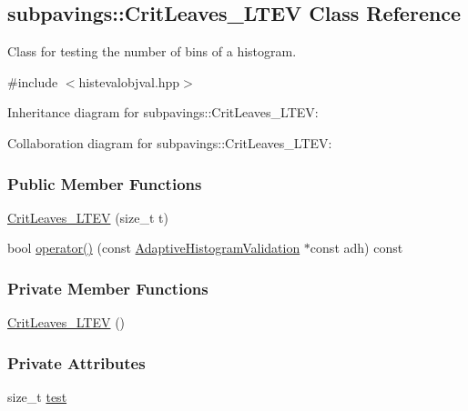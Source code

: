 \hypertarget{classsubpavings_1_1CritLeaves__LTEV}{\subsection{subpavings\-:\-:\-Crit\-Leaves\-\_\-\-L\-T\-E\-V \-Class \-Reference}
\label{classsubpavings_1_1CritLeaves__LTEV}
}


\-Class for testing the number of bins of a histogram.  




{\ttfamily \#include $<$histevalobjval.\-hpp$>$}



\-Inheritance diagram for subpavings\-:\-:\-Crit\-Leaves\-\_\-\-L\-T\-E\-V\-:


\-Collaboration diagram for subpavings\-:\-:\-Crit\-Leaves\-\_\-\-L\-T\-E\-V\-:
\subsubsection*{\-Public \-Member \-Functions}
\begin{DoxyCompactItemize}
\item 
\hyperlink{classsubpavings_1_1CritLeaves__LTEV_a9d5c9272d5b73caee48f245fcc6889e5}{\-Crit\-Leaves\-\_\-\-L\-T\-E\-V} (size\-\_\-t t)
\item 
bool \hyperlink{classsubpavings_1_1CritLeaves__LTEV_af02abe8af576a43ccd40e44cc55fcf1e}{operator()} (const \hyperlink{classsubpavings_1_1AdaptiveHistogramValidation}{\-Adaptive\-Histogram\-Validation} $\ast$const adh) const 
\end{DoxyCompactItemize}
\subsubsection*{\-Private \-Member \-Functions}
\begin{DoxyCompactItemize}
\item 
\hyperlink{classsubpavings_1_1CritLeaves__LTEV_a7487eb532d0eec38777cd97e8ed91327}{\-Crit\-Leaves\-\_\-\-L\-T\-E\-V} ()
\end{DoxyCompactItemize}
\subsubsection*{\-Private \-Attributes}
\begin{DoxyCompactItemize}
\item 
size\-\_\-t \hyperlink{classsubpavings_1_1CritLeaves__LTEV_aa89f9c6b90f4472cd45dbb21f9658152}{test}
\end{DoxyCompactItemize}


